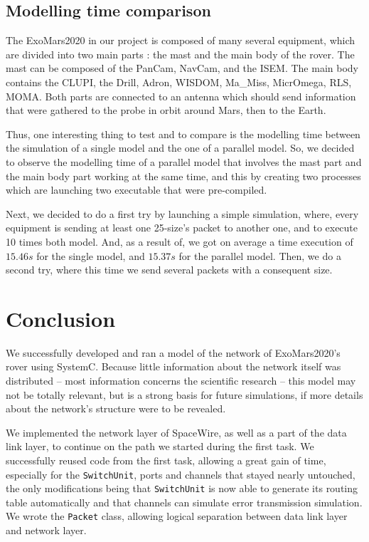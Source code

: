 \documentclass[12pt,a4paper]{article}
\begin{document}
\subsection{Modelling time comparison}
The ExoMars2020 in our project is composed of many several equipment, which are divided into two main parts : the mast and the main body of the rover. The mast can be composed of the PanCam, NavCam, and the ISEM. The main body contains the CLUPI, the Drill, Adron, WISDOM, Ma\_Miss, MicrOmega, RLS, MOMA. Both parts are connected to an antenna which should send information that were gathered to the probe in orbit around Mars, then to the Earth.\smallbreak

Thus, one interesting thing to test and to compare is the modelling time between the simulation of a single model and the one of a parallel model. So, we decided to observe the modelling time of a parallel model that involves the mast part and the main body part working at the same time, and this by creating two processes which are launching two executable that were pre-compiled.\smallbreak

Next, we decided to do a first try by launching a simple simulation, where, every equipment is sending at least one 25-size's packet to another one, and to execute 10 times both model. And, as a result of, we got on average a time execution of $15.46 s$ for the single model, and $15.37 s$ for the parallel model. Then, we do a second try, where this time we send several packets with a consequent size.\smallbreak

\pagebreak

\section{Conclusion}

We successfully developed and ran a model of the network of ExoMars2020's rover  using SystemC. Because little information about the network itself was distributed \--- most information concerns the scientific research \--- this model may not be totally relevant, but is a strong basis for future simulations, if more details about the network's structure were to be revealed.

We implemented the network layer of SpaceWire, as well as a part of the data link layer, to continue on the path we started during the first task. We successfully reused code from the first task, allowing a great gain of time, especially for the \texttt{SwitchUnit}, ports and channels that stayed nearly untouched, the only modifications being that \texttt{SwitchUnit} is now able to generate its routing table automatically and that channels can simulate error transmission simulation. We wrote the \texttt{Packet} class, allowing logical separation between data link layer and network layer.
\end{document}
